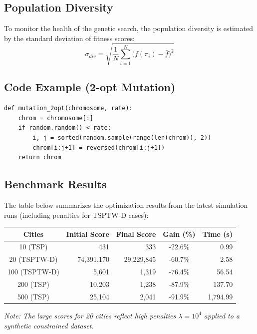 \documentclass{article}
\begin{document}
\subsection*{Population Diversity}
To monitor the health of the genetic search, the population diversity is estimated by the standard deviation of
fitness scores:
\[ \sigma_{div} = \sqrt{\frac{1}{N}\sum_{i=1}^{N}\bigl(f(\pi_i) - \bar{f}\bigr)^2} \]
\subsection*{Code Example (2-opt Mutation)}
\begin{verbatim}
def mutation_2opt(chromosome, rate):
    chrom = chromosome[:]
    if random.random() < rate:
        i, j = sorted(random.sample(range(len(chrom)), 2))
        chrom[i:j+1] = reversed(chrom[i:j+1])
    return chrom
\end{verbatim}
\subsection*{Benchmark Results}
The table below summarizes the optimization results from the latest simulation runs (including penalties for
TSPTW-D cases):
\begin{center}
\begin{tabular}{|c|r|r|c|r|}
\hline
\textbf{Cities} & \textbf{Initial Score} & \textbf{Final Score} & \textbf{Gain (\%)} & \textbf{Time (s)} \\
\hline
10 (TSP) & 431 & 333 & -22.6\% & 0.99 \\
20 (TSPTW-D) & 74,391,170 & 29,229,845 & -60.7\% & 2.58 \\
100 (TSPTW-D) & 5,601 & 1,319 & -76.4\% & 56.54 \\
200 (TSP) & 10,203 & 1,238 & -87.9\% & 137.70 \\
500 (TSP) & 25,104 & 2,041 & -91.9\% & 1,794.99 \\
\hline
\end{tabular}
\end{center}
\textit{Note: The large scores for 20 cities reflect high penalties $\lambda=10^4$ applied to a synthetic
constrained dataset.}
\end{document}
